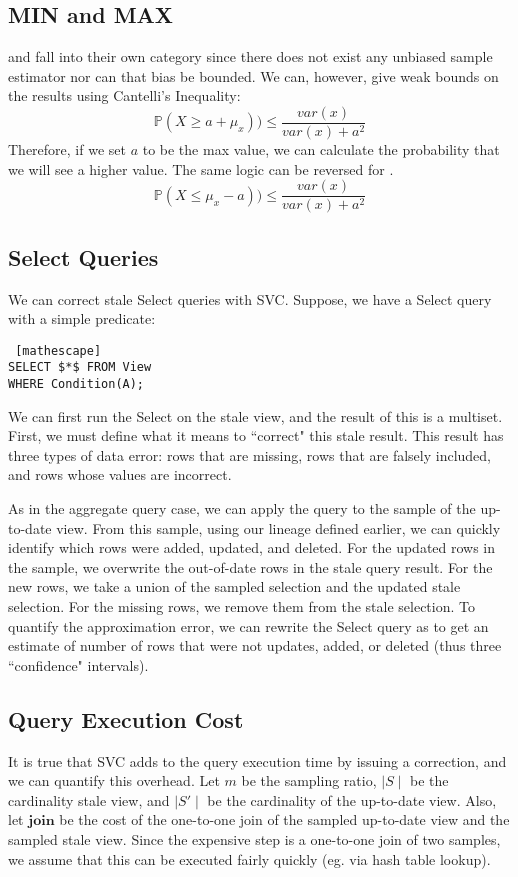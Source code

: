 \subsection{MIN and MAX}
\minfunc and \maxfunc fall into their own category since there does not exist any unbiased sample estimator nor can that bias be bounded.
We can, however, give weak bounds on the results using Cantelli's Inequality:
\[
\mathbb{P}(X \ge a + \mu_x )) \le \frac{var(x)}{var(x) + a^2}
\]
Therefore, if we set $a$ to be the max value, we can calculate the probability that we will see a higher value. The same logic can be reversed for \minfunc.
\[
\mathbb{P}(X \le \mu_x - a )) \le \frac{var(x)}{var(x) + a^2}
\]

\subsection{Select Queries}
We can correct stale Select queries with SVC.
Suppose, we have a Select query with a simple predicate:
\begin{lstlisting} [mathescape]
SELECT $*$ FROM View 
WHERE Condition(A);
\end{lstlisting}

We can first run the Select on the stale view, and the result of this is a multiset.
First, we must define what it means to ``correct" this stale result.
This result has three types of data error: rows that are missing, rows that are falsely included, and rows whose values are incorrect.

As in the aggregate query case, we can apply the query to the sample of the up-to-date view.
From this sample, using our lineage defined earlier, we can quickly identify which rows were added, updated, and deleted.
For the updated rows in the sample, we overwrite the out-of-date rows in the stale query result.
For the new rows, we take a union of the sampled selection and the updated stale selection.
For the missing rows, we remove them from the stale selection.
To quantify the approximation error, we can rewrite the Select query as \countfunc to get an estimate of number of rows that were not updates, added, or deleted (thus three ``confidence" intervals).

\subsection{Query Execution Cost}
It is true that SVC adds to the query execution time by issuing a correction, and we can quantify this overhead. Let $m$ be the sampling ratio, $\mid S \mid$ be the cardinality stale view, and $\mid S' \mid$ be the cardinality  of the up-to-date view. Also, let $\textbf{join}$ be the cost of the one-to-one join of the sampled up-to-date view and the sampled stale view. Since the expensive step is a one-to-one join of two samples, we assume that this can be executed fairly quickly (eg. via hash table lookup).


